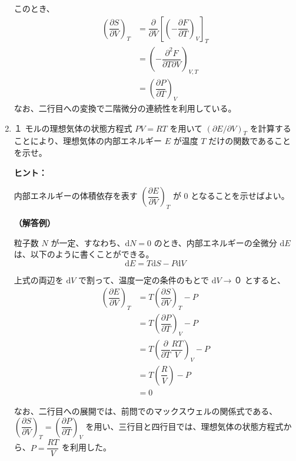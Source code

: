 \documentclass[uplatex,dvipdfmx,a4paper,11pt]{jsarticle}
\newcommand{\diff}{\mathrm d}
\begin{document}
\begin{enumerate}
このとき、
\begin{align*}
\left( \dfrac{\partial S}{\partial V} \right)_T 
	&= \dfrac{\partial}{\partial V} \left[ \left( - \dfrac{\partial F}{\partial T} \right)_V \right]_T \\
	&= \left( - \dfrac{\partial^2 F}{\partial T \partial V} \right)_{V, T} \\
	&= \left( \dfrac{\partial P}{\partial T} \right)_{V} 
\end{align*}
なお、二行目への変換で二階微分の連続性を利用している。
\newpage

\item
１ モルの理想気体の状態方程式 $PV = RT$ を用いて $(\partial E / \partial V)_T$ を計算することにより、理想気体の内部エネルギー $E$ が温度 $T$ だけの関数であることを示せ。
\vspace{8pt}

\begin{itembox}[l]{{\bf ヒント：}}

内部エネルギーの体積依存を表す $\left(\dfrac{\partial E}{\partial V} \right)_T$ が 0 となることを示せばよい。

\end{itembox}
\vspace{8pt}

{\bf （解答例）}

粒子数 $N$ が一定、すなわち、$\diff N = 0$ のとき、内部エネルギーの全微分 $\diff E$ は、以下のように書くことができる。
\begin{equation*}
\diff E = T \diff S - P \diff V
\end{equation*}

上式の両辺を $\diff V$ で割って、温度一定の条件のもとで $\diff V \rightarrow ０$ とすると、
\begin{align*}
\left(\dfrac{\partial E}{\partial V} \right)_T 
	&= T \left(\dfrac{\partial S}{\partial V} \right)_T -P \\
	&= T \left(\dfrac{\partial P}{\partial T} \right)_V -P \\
	&= T \left(\dfrac{\partial}{\partial T} \dfrac {RT}{V} \right)_V -P \\
	&= T \left(\dfrac {R}{V}\right) -P \\
	&= 0
\end{align*}

なお、二行目への展開では、前問でのマックスウェルの関係式である、$\left(\dfrac{\partial S}{\partial V} \right)_T = \left(\dfrac{\partial P}{\partial T} \right)_V$ を用い、三行目と四行目では、理想気体の状態方程式から、$P = \dfrac {RT}{V}$ を利用した。


\end{enumerate}
\end{document}
